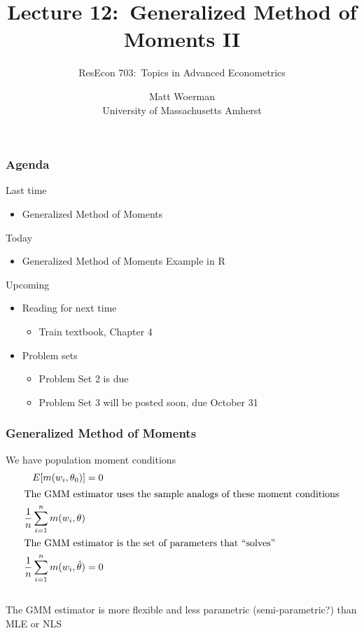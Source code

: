 \documentclass{beamer}
\title[Lecture 12:\ Generalized Method of Moments II]{Lecture 12:\ Generalized Method of Moments II}
\author[ResEcon 703:\ Advanced Econometrics]{ResEcon 703:\ Topics in Advanced Econometrics}
\date{Matt Woerman\\University of Massachusetts Amherst}
\begin{document}
{ 
\begin{frame}[noframenumbering]
    \titlepage
\end{frame}
}

\begin{frame}\frametitle{Agenda}
    Last time
    \begin{itemize}
        \item Generalized Method of Moments
    \end{itemize}
    \vspace{2ex}
    Today
    \begin{itemize}
        \item Generalized Method of Moments Example in R
    \end{itemize}
    \vspace{2ex}
    Upcoming
    \begin{itemize}
        \item Reading for next time
        \begin{itemize}
            \item Train textbook, Chapter 4
        \end{itemize}
        \item Problem sets
        \begin{itemize}
            \item Problem Set 2 is due
            \item Problem Set 3 will be posted soon, due October 31
        \end{itemize}
    \end{itemize}
\end{frame}

\begin{frame}\frametitle{Generalized Method of Moments}
    We have population moment conditions
    \begin{align*}
        E[m(w_i, \theta_0)] &= 0 \\
        \intertext{The GMM estimator uses the sample analogs of these moment conditions}
        \frac{1}{n} \sum_{i = 1}^n m(w_i, \theta) & \\
        \intertext{The GMM estimator is the set of parameters that ``solves''}
        \frac{1}{n} \sum_{i = 1}^n m(w_i, \hat{\theta}) &= 0
    \end{align*} \\
    \vspace{2ex}
    The GMM estimator is more flexible and less parametric (semi-parametric?) than MLE or NLS
\end{frame}
\end{document}
